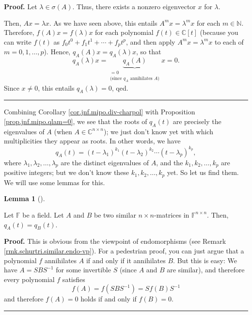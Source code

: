 \documentclass[numbers=enddot,12pt,final,onecolumn,notitlepage]{scrartcl}%
\numberwithin{exer}{subsection}
\theoremstyle{definition}
\newtheorem{lem}[theo]{Lemma}
\newenvironment{lemma}[1][]
{\begin{lem}[#1]\begin{leftbar}}
{\end{leftbar}\end{lem}}
\newenvironment{proof}[1][Proof]{\noindent\textbf{#1.} }{\ \rule{0.5em}{0.5em}}
\begin{document}
\begin{proof}
Let $\lambda\in\sigma\left(  A\right)  $. Thus, there exists a nonzero
eigenvector $x$ for $\lambda$.

Then, $Ax=\lambda x$. As we have seen above, this entails $A^{m}x=\lambda
^{m}x$ for each $m\in\mathbb{N}$. Therefore, $f\left(  A\right)  x=f\left(
\lambda\right)  x$ for each polynomial $f\left(  t\right)  \in\mathbb{C}%
\left[  t\right]  $ (because you can write $f\left(  t\right)  $ as
$f_{0}t^{0}+f_{1}t^{1}+\cdots+f_{p}t^{p}$, and then apply $A^{m}x=\lambda
^{m}x$ to each of $m=0,1,\ldots,p$). Hence, $q_{A}\left(  A\right)
x=q_{A}\left(  \lambda\right)  x$, so that%
\[
q_{A}\left(  \lambda\right)  x=\underbrace{q_{A}\left(  A\right)
}_{\substack{=0\\\text{(since }q_{A}\text{ annihilates }A\text{)}}}x=0.
\]
Since $x\neq0$, this entails $q_{A}\left(  \lambda\right)  =0$, qed.
\end{proof}

Combining Corollary \ref{cor.jnf.mipo.div-charpol} with Proposition
\ref{prop.jnf.mipo.qlam=0}, we see that the roots of $q_{A}\left(  t\right)  $
are precisely the eigenvalues of $A$ (when $A\in\mathbb{C}^{n\times n}$); we
just don't know yet with which multiplicities they appear as roots. In other
words, we have
\[
q_{A}\left(  t\right)  =\left(  t-\lambda_{1}\right)  ^{k_{1}}\left(
t-\lambda_{2}\right)  ^{k_{2}}\cdots\left(  t-\lambda_{p}\right)  ^{k_{p}},
\]
where $\lambda_{1},\lambda_{2},\ldots,\lambda_{p}$ are the distinct
eigenvalues of $A$, and the $k_{1},k_{2},\ldots,k_{p}$ are positive integers;
but we don't know these $k_{1},k_{2},\ldots,k_{p}$ yet. So let us find them.
We will use some lemmas for this.

\begin{lemma}
\label{lem.jnf.mipo.similar}Let $\mathbb{F}$ be a field. Let $A$ and $B$ be
two similar $n\times n$-matrices in $\mathbb{F}^{n\times n}$. Then,
$q_{A}\left(  t\right)  =q_{B}\left(  t\right)  $.
\end{lemma}

\begin{proof}
This is obvious from the viewpoint of endomorphisms (see Remark
\ref{rmk.schurtri.similar.endo-vp}). For a pedestrian proof, you can just
argue that a polynomial $f$ annihilates $A$ if and only if it annihilates $B$.
But this is easy: We have $A=SBS^{-1}$ for some invertible $S$ (since $A$ and
$B$ are similar), and therefore every polynomial $f$ satisfies
\[
f\left(  A\right)  =f\left(  SBS^{-1}\right)  =Sf\left(  B\right)  S^{-1}%
\]
and therefore $f\left(  A\right)  =0$ holds if and only if $f\left(  B\right)
=0$.
\end{proof}
\end{document}
